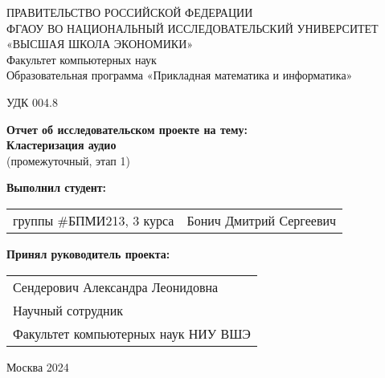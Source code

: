\begin{titlepage}
\newpage

{
\begin{center}
ПРАВИТЕЛЬСТВО РОССИЙСКОЙ ФЕДЕРАЦИИ\\
ФГАОУ ВО НАЦИОНАЛЬНЫЙ ИССЛЕДОВАТЕЛЬСКИЙ УНИВЕРСИТЕТ\\
«ВЫСШАЯ ШКОЛА ЭКОНОМИКИ»
\\
\bigskip
Факультет компьютерных наук\\
Образовательная программа «Прикладная математика и информатика»
\end{center}
}

\vspace{2em}
УДК 004.8 %
\vspace{5em}

\begin{center}
{\bf Отчет об исследовательском проекте на тему:}\\
{\bf Кластеризация аудио}\\
(промежуточный, этап 1)
\end{center}

\vspace{2em}

{\bf Выполнил студент: \vspace{2mm}}

{
\begin{tabular}{l@{\hskip 1.5cm}l}
группы \#БПМИ213, 3 курса & Бонич Дмитрий Сергеевич 
\end{tabular}}

\vspace{1em}
{\bf Принял руководитель проекта: \vspace{2mm}}

{
\begin{tabular}{l}
Сендерович Александра Леонидовна\\
Научный сотрудник\\
Факультет компьютерных наук НИУ ВШЭ 
\end{tabular}}

\vspace{\fill}

\begin{center}
Москва 2024
\end{center}

\end{titlepage}
